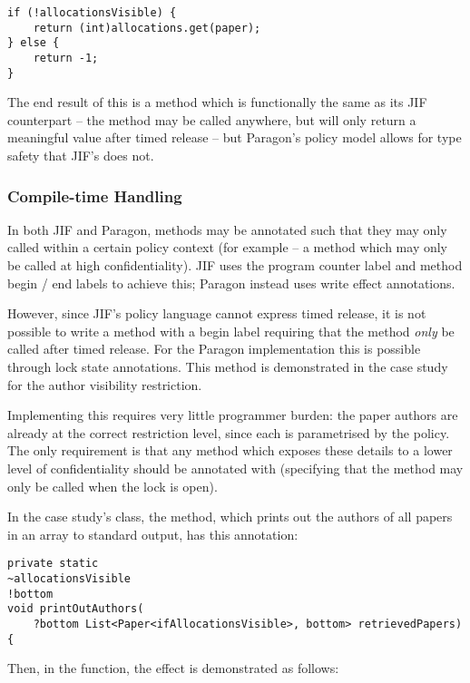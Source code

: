 \begin{verbatim}
if (!allocationsVisible) {
	return (int)allocations.get(paper);
} else {
	return -1;
}
\end{verbatim}

The end result of this is a method which is functionally the same as its JIF counterpart -- the method may be called anywhere, but will only return a meaningful value after timed release -- but Paragon's policy model allows for type safety that JIF's does not.

\subsubsection{Compile-time Handling}

In both JIF and Paragon, methods may be annotated such that they may only called within a certain policy context (for example -- a method which may only be called at high confidentiality). JIF uses the program counter label and method begin / end labels to achieve this; Paragon instead uses write effect annotations.

However, since JIF's policy language cannot express timed release, it is not possible to write a method with a begin label requiring that the method \textit{only} be called after timed release. For the Paragon implementation this is possible through lock state annotations. This method is demonstrated in the case study for the author visibility restriction.

Implementing this requires very little programmer burden: the paper authors are already at the correct restriction level, since each  is parametrised by the  policy. The only requirement is that any method which exposes these details to a lower level of confidentiality should be annotated with  (specifying that the method may only be called when the  lock is open).

In the case study's  class, the  method, which prints out the authors of all papers in an array to standard output, has this annotation:

\begin{verbatim}
private static
~allocationsVisible
!bottom
void printOutAuthors(
	?bottom List<Paper<ifAllocationsVisible>, bottom> retrievedPapers) {
\end{verbatim}

Then, in the  function, the effect is demonstrated as follows:

